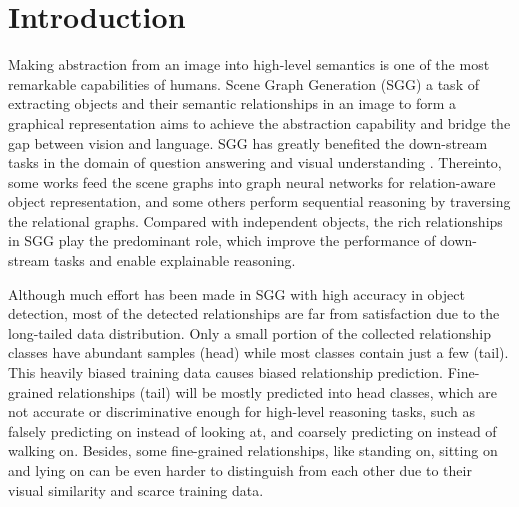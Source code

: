 \documentclass[letterpaper]{article} \usepackage{aaai21}  \usepackage{times}  \usepackage{helvet} \usepackage{courier}  \usepackage[hyphens]{url}  \usepackage{graphicx} \urlstyle{rm} \def\UrlFont{\rm}  \usepackage{natbib}  \usepackage{caption} \frenchspacing  \setlength{\pdfpagewidth}{8.5in}  \setlength{\pdfpageheight}{11in}  \usepackage{amsmath,amsthm}
\begin{document}
\section{Introduction}
\label{sec:intro}
Making abstraction from an image into high-level semantics is one of the most remarkable capabilities of humans. Scene Graph Generation (SGG) \cite{krishna2017visual}  a task of extracting objects and their semantic relationships in an image to form a graphical representation  aims to achieve the abstraction capability and bridge the gap between vision and language. SGG has greatly benefited the down-stream tasks in the domain of question answering \cite{norcliffe2018learning,Zhu2020Mucko} and visual understanding \cite{shi2019explainable,Jiang2020DualVD}. Thereinto, some works \cite{Zhu2020Mucko,Jiang2020DualVD} feed the scene graphs into graph neural networks for relation-aware object representation, and some others \cite{hudson2019learning} perform sequential reasoning by traversing the relational graphs. Compared with independent objects, the rich relationships in SGG play the predominant role, which improve the performance of down-stream tasks and enable explainable reasoning. 




Although much effort has been made in SGG with high accuracy in object detection, most of the detected relationships are far from satisfaction due to the long-tailed data distribution. Only a small portion of the collected relationship classes have abundant samples (head) while most classes contain just a few (tail). This heavily biased training data causes biased relationship prediction. Fine-grained relationships (tail) will be mostly predicted into head classes, which are not accurate or discriminative  enough for high-level reasoning tasks, such as falsely predicting {\ttfamily on} instead of {\ttfamily looking at}, and coarsely predicting {\ttfamily on} instead of {\ttfamily walking on}.  Besides, some fine-grained relationships, like {\ttfamily standing on}, {\ttfamily sitting on} and {\ttfamily lying on} can be even harder to distinguish from each other due to their visual similarity and scarce training data.
\end{document}
